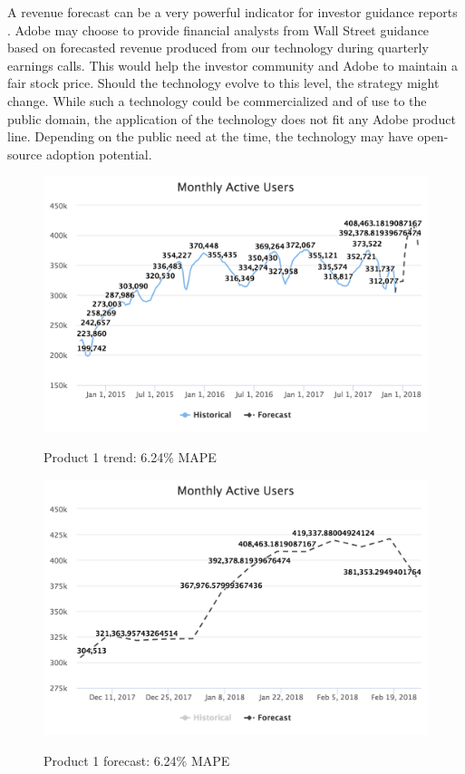 \documentclass[11pt, oneside, authoryear]{report}
\begin{document}
A revenue forecast can be a very powerful indicator for investor guidance reports \citep{xu}. Adobe may choose to provide financial analysts from Wall Street guidance based on forecasted revenue produced from our technology during quarterly earnings calls. This would help the investor community and Adobe to maintain a fair stock price. Should the technology evolve to this level, the strategy might change. While such a technology could be commercialized and of use to the public domain, the application of the technology does not fit any Adobe product line. Depending on the public need at the time, the technology may have open-source adoption potential.

\newpage



\newpage
\begin{appendices}
  \begin{figure}[h]
    \caption{Product 1 trend: 6.24\% MAPE}
    \centering
    \includegraphics[width=12.5cm]{images/Product_1-Trend-6_24_Percent_MAPE.png}
    \label{fig:Product_1-Trend}
  \end{figure}

  \begin{figure}[h]
    \caption{Product 1 forecast: 6.24\% MAPE}
    \centering
    \includegraphics[width=12.5cm]{images/Product_1-Forecast-6_24_Percent_MAPE.png}
    \label{fig:Product_1-Forecast}
  \end{figure}


\end{appendices}
\end{document}
